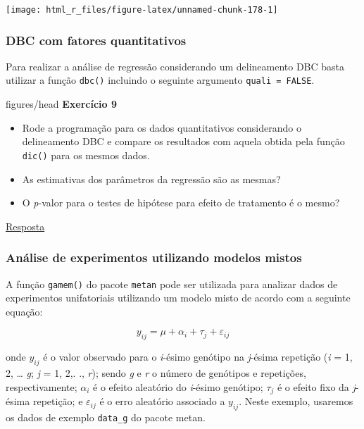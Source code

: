 \documentclass[
]{book}
\makeatletter
\numberwithin{equation}{section}
\newcommand{\indf}[1]{\index[function]{#1@\texttt{#1()}|ST}}
\newcommand{\indt}[1]{\index{#1|ST}}
\newenvironment{tarefa}
  {\begin{customBlockImage}[colframe=customOrange, title=Tarefa de casa]{figures/head}}
  {\end{customBlockImage}}
\makeatother
\begin{document}
\begin{center}\texttt{[image: html\_r\_files/figure-latex/unnamed-chunk-178-1]} \end{center}

\hypertarget{dbc-com-fatores-quantitativos}{%
\subsubsection{DBC com fatores quantitativos}\label{dbc-com-fatores-quantitativos}}

Para realizar a análise de regressão considerando um delineamento DBC basta utilizar a função \texttt{dbc()} \indf{rbd} incluindo o seguinte argumento \texttt{quali\ =\ FALSE}.

\indt{Exercícios}
\begin{tarefa}
\textbf{Exercício 9}

\begin{itemize}
\item
  Rode a programação para os dados quantitativos considerando o delineamento DBC e compare os resultados com aquela obtida pela função \texttt{dic()} para os mesmos dados.
\item
  As estimativas dos parâmetros da regressão são as mesmas?
\item
  O \emph{p}-valor para o testes de hipótese para efeito de tratamento é o mesmo?
\end{itemize}
\end{tarefa}

\protect\hyperlink{exerc9}{Resposta}

\hypertarget{anuxe1lise-de-experimentos-utilizando-modelos-mistos}{%
\subsubsection{Análise de experimentos utilizando modelos mistos}\label{anuxe1lise-de-experimentos-utilizando-modelos-mistos}}

A função \texttt{gamem()} do pacote \texttt{metan} pode ser utilizada para analizar dados de experimentos unifatoriais utilizando um modelo misto de acordo com a seguinte equação:

\[
y_{ij}= \mu  + \alpha_i + \tau_j + \varepsilon_{ij}
\]

onde \(y_ {ij}\) é o valor observado para o \emph{i}-ésimo genótipo na \emph{j}-ésima repetição (\emph{i} = 1, 2, \ldots{} \emph{g}; \emph{j} = 1, 2,. ., \emph{r}); sendo \emph{g} e \emph{r} o número de genótipos e repetições, respectivamente; \(\alpha_i\) é o efeito aleatório do \emph{i}-ésimo genótipo; \(\tau_j\) é o efeito fixo da \emph{j}-ésima repetição; e \(\varepsilon_ {ij}\) é o erro aleatório associado a \(y_{ij}\). Neste exemplo, usaremos os dados de exemplo \texttt{data\_g} do pacote metan.
\end{document}
